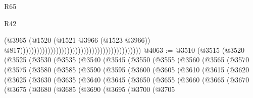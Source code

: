 \begin{lexlean}{R65}
\begin{lexlean}{R42}
\begin{coremodule}
{{{{{{{{{{{{{{{{{{{{{{{{{{{{{{{{{{{{{{{{{{{{{{{{{{{{{{{{{{{{{{{{{{{{{{{{{{{{{{{{{{{{{{{{{{{{{{{{{{{{{{{{{{{{{{{{{{{{{{{{{{{{{{{{{{{{{{{{{{{{{{{{{{{{{{{{{{{{{{{{{{{{{{{{{{{{{{{{{{{{{{{{                                                                                        (@3965
                                                                                          (@1520
                                                                                            (@1521
                                                                                              @3966
                                                                                              (@1523
                                                                                                @3966))
                                                                                            @817))))))))))))))))))))))))))))))))))))))))))))
@4063 := @3510
    (@3515
      (@3520
        (@3525
          (@3530
            (@3535
              (@3540
                (@3545
                  (@3550
                    (@3555
                      (@3560
                        (@3565
                          (@3570
                            (@3575
                              (@3580
                                (@3585
                                  (@3590
                                    (@3595
                                      (@3600
                                        (@3605
                                          (@3610
                                            (@3615
                                              (@3620
                                                (@3625
                                                  (@3630
                                                    (@3635
                                                      (@3640
                                                        (@3645
                                                          (@3650
                                                            (@3655
                                                              (@3660
                                                                (@3665
                                                                  (@3670
                                                                    (@3675
                                                                      (@3680
                                                                        (@3685
                                                                          (@3690
                                                                            (@3695
                                                                              (@3700
                                                                                (@3705
}}}}}}}}}}}}}}}}}}}}}}}}}}}}}}}}}}}}}}}}}}}}}}}}}}}}}}}}}}}}}}}}}}}}}}}}}}}}}}}}}}}}}}}}}}}}}}}}}}}}}}}}}}}}}}}}}}}}}}}}}}}}}}}}}}}}}}}}}}}}}}}}}}}}}}}}}}}}}}}}}}}}}}}}}}}}}}}}}}}}}}}}
\end{coremodule}
\end{lexlean}
\end{lexlean}
